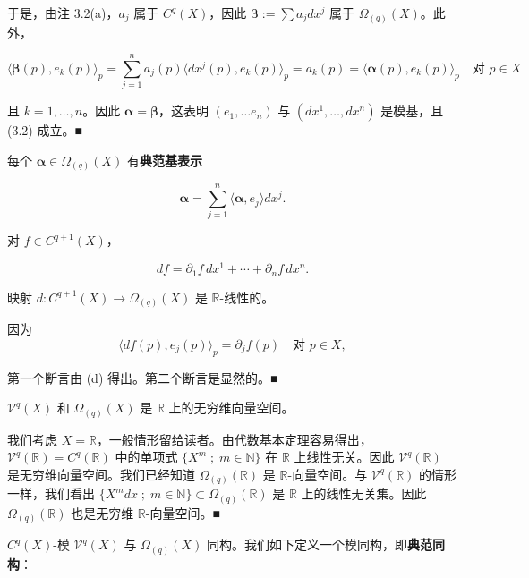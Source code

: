 \begin{remark}
\begin{items}
于是，由注 3.2(a)，$ a_{j} $ 属于 $ C^{q}(X) $，因此 $ \boldsymbol{\beta} := \sum a_{j}dx^{j} $ 属于 $ \Omega_{(q)}(X) $。此外，

\[
\langle\boldsymbol{\beta}(p),e_{k}(p)\rangle_{p} = \sum_{j=1}^{n}a_{j}(p)\langle dx^{j}(p),e_{k}(p)\rangle_{p} = a_{k}(p) = \langle\boldsymbol{\alpha}(p),e_{k}(p)\rangle_{p} \quad \text{对 } p \in X
\]

且 $ k = 1,\ldots,n $。因此 $ \boldsymbol{\alpha} = \boldsymbol{\beta} $，这表明 $ (e_{1},\ldots e_{n}) $ 与 $ (dx^{1},\ldots,dx^{n}) $ 是模基，且 (3.2) 成立。\nobreak\hspace{0.35em}■

\item

每个 $ \boldsymbol{\alpha} \in \Omega_{(q)}(X) $ 有\textbf{典范基表示}

\[
\boldsymbol{\alpha} = \sum_{j=1}^{n}\langle\boldsymbol{\alpha},e_{j}\rangle dx^{j} .
\]
\item

对 $ f \in C^{q+1}(X) $，

\[
df = \partial_{1}f\,dx^{1} + \cdots + \partial_{n}f\,dx^{n} .
\]

映射 $ d : C^{q+1}(X) \to \Omega_{(q)}(X) $ 是 $ \mathbb{R} $-线性的。

\proofhead
因为
\[
\langle df(p),e_{j}(p)\rangle_{p} = \partial_{j}f(p) \quad \text{对 } p \in X ,
\]

第一个断言由 (d) 得出。第二个断言是显然的。\nobreak\hspace{0.35em}■

\item

$ \mathcal{V}^{q}(X) $ 和 $ \Omega_{(q)}(X) $ 是 $ \mathbb{R} $ 上的无穷维向量空间。

\proofhead
我们考虑 $ X = \mathbb{R} $，一般情形留给读者。由代数基本定理容易得出，$ \mathcal{V}^{q}(\mathbb{R}) = C^{q}(\mathbb{R}) $ 中的单项式 $ \{X^{m} \;;\; m \in \mathbb{N}\} $ 在 $ \mathbb{R} $ 上线性无关。因此 $ \mathcal{V}^{q}(\mathbb{R}) $ 是无穷维向量空间。我们已经知道 $ \Omega_{(q)}(\mathbb{R}) $ 是 $ \mathbb{R} $-向量空间。与 $ \mathcal{V}^{q}(\mathbb{R}) $ 的情形一样，我们看出 $ \{X^{m}dx \;;\; m \in \mathbb{N}\} \subset \Omega_{(q)}(\mathbb{R}) $ 是 $ \mathbb{R} $ 上的线性无关集。因此 $ \Omega_{(q)}(\mathbb{R}) $ 也是无穷维 $ \mathbb{R} $-向量空间。\nobreak\hspace{0.35em}■
\item

$ C^{q}(X) $-模 $ \mathcal{V}^{q}(X) $ 与 $ \Omega_{(q)}(X) $ 同构。我们如下定义一个模同构，即\textbf{典范同构}：


\end{items}
\end{remark}
